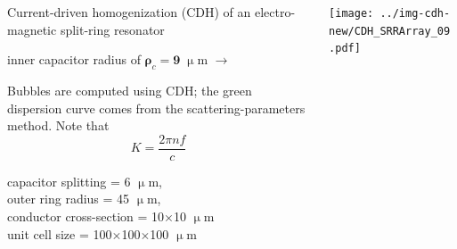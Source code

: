 \documentclass[t]{beamer} \usepackage[english]{babel} \usepackage[utf8]{inputenc} \usetheme{Frankfurt} %
\begin{document}
\begin{frame}[plain]{}%
\begin{columns}[T] %
	\begin{column}{.55\textwidth}
	\vspace{3mm}
	\noindent Current-driven homogenization (CDH) of an electro-magnetic split-ring resonator 
	\begin{exampleblock}\hfill inner capacitor radius of $\pmb\rho_c=\pmb{9}\;\upmu$m $\rightarrow$\end{exampleblock}
	\vspace{3mm}

	\noindent Bubbles are computed using CDH; the green dispersion curve comes from the scattering-parameters method. Note that $$K = \frac{2\pi n f}{c}$$
	\vspace{12mm}

	\small{capacitor splitting = 6 $\upmu$m,\\ outer ring radius = 45 $\upmu$m,\\ conductor cross-section = 10$\times$10 $\upmu$m\\ unit cell size = 100$\times$100$\times$100 $\upmu$m}
	\vspace{5mm}

	\end{column}%
	\begin{column}{.45\textwidth}%
		\vspace{-1mm}\texttt{[image: ../img-cdh-new/CDH\_SRRArray\_09.pdf]} 
	\end{column}
\end{columns}
\end{frame} 		%
\end{document}
